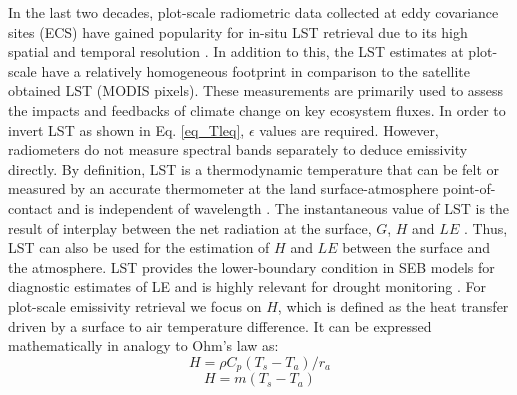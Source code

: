 \documentclass[fleqn,10pt]{wlscirep}
\begin{document}
In the last two decades, plot-scale radiometric data collected at eddy covariance sites (ECS) have gained popularity for in-situ LST retrieval due to its high spatial and temporal resolution \cite{stoy2013data,cullen2007energy}. In addition to this, the LST estimates at plot-scale have a relatively homogeneous footprint in comparison to the satellite obtained LST (MODIS pixels). These measurements are primarily used to assess the impacts and feedbacks of climate change on key ecosystem fluxes\cite{baldocchi2001fluxnet}. In order to invert LST as shown in Eq. \eqref{eq_Tleq}, $\epsilon$ values are required. However, radiometers do not measure spectral bands separately to deduce emissivity directly.
By definition, LST is a thermodynamic temperature that can be felt or measured by an accurate thermometer at the land surface-atmosphere point-of-contact and is independent of wavelength \cite{guillevic2017land}. The instantaneous value of LST is the result of interplay between the net radiation at the surface, $G$, $H$ and $LE$ \cite{wang_global_2013-2}. Thus, LST can also be used for the estimation of $H$ \cite{sun1995relationship} and $LE$ \cite{jacob2001comprehensive} between the surface and the atmosphere. LST provides the lower-boundary condition in SEB models for diagnostic estimates of LE  and is highly relevant for drought monitoring \cite{trebs2021role,mallick2016canopy,mallick2015reintroducing}. For plot-scale emissivity retrieval we focus on $H$, which is defined as the heat transfer driven by a surface to air temperature difference. It can be expressed mathematically in analogy to Ohm's law as:
\begin{equation}\label{eq_H1}
H= \rho C_{p}(T_{s} - T_{a})/r_{a}
\end{equation}
\begin{equation}\label{eq_H}
H= m(T_{s} - T_{a})
\end{equation}
\end{document}
